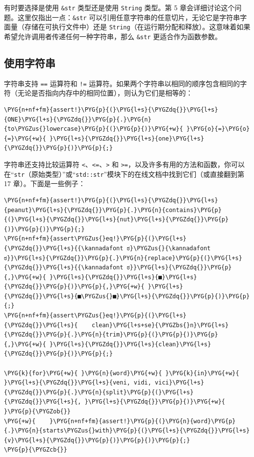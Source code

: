 有时要选择是使用 \texttt{\&str} 类型还是使用 \texttt{String} 类型。第 5 章会详细讨论这个问题。这里仅指出一点：\texttt{\&str} 可以引用任意字符串的任意切片，无论它是字符串字面量（存储在可执行文件中）还是 \texttt{String}（在运行期分配和释放）。这意味着如果希望允许调用者传递任何一种字符串，那么 \texttt{\&str} 更适合作为函数参数。

\subsection{使用字符串}

字符串支持 \texttt{==} 运算符和 \texttt{!=} 运算符。如果两个字符串以相同的顺序包含相同的字符（无论是否指向内存中的相同位置），则认为它们是相等的：

\begin{Verbatim}[commandchars=\\\{\},breaklines=true,breakanywhere=true,fontsize=\codefont,xleftmargin=17bp]
\PYG{n+nf+fm}{assert!}\PYG{p}{(}\PYG{l+s}{\PYGZdq{}}\PYG{l+s}{ONE}\PYG{l+s}{\PYGZdq{}}\PYG{p}{.}\PYG{n}{to\PYGZus{}lowercase}\PYG{p}{(}\PYG{p}{)}\PYG{+w}{ }\PYG{o}{=}\PYG{o}{=}\PYG{+w}{ }\PYG{l+s}{\PYGZdq{}}\PYG{l+s}{one}\PYG{l+s}{\PYGZdq{}}\PYG{p}{)}\PYG{p}{;}
\end{Verbatim}

字符串还支持比较运算符 \texttt{<}、\texttt{<=}、\texttt{>} 和 \texttt{>=}，以及许多有用的方法和函数，你可以在“\texttt{str}（原始类型）”或“\texttt{std::str}”模块下的在线文档中找到它们（或直接翻到第 17 章）。下面是一些例子：

\begin{Verbatim}[commandchars=\\\{\},breaklines=true,breakanywhere=true,fontsize=\codefont,xleftmargin=17bp]
\PYG{n+nf+fm}{assert!}\PYG{p}{(}\PYG{l+s}{\PYGZdq{}}\PYG{l+s}{peanut}\PYG{l+s}{\PYGZdq{}}\PYG{p}{.}\PYG{n}{contains}\PYG{p}{(}\PYG{l+s}{\PYGZdq{}}\PYG{l+s}{nut}\PYG{l+s}{\PYGZdq{}}\PYG{p}{)}\PYG{p}{)}\PYG{p}{;}
\PYG{n+nf+fm}{assert\PYGZus{}eq!}\PYG{p}{(}\PYG{l+s}{\PYGZdq{}}\PYG{l+s}{{\kannadafont ಠ}\PYGZus{}{\kannadafont ಠ}}\PYG{l+s}{\PYGZdq{}}\PYG{p}{.}\PYG{n}{replace}\PYG{p}{(}\PYG{l+s}{\PYGZdq{}}\PYG{l+s}{{\kannadafont ಠ}}\PYG{l+s}{\PYGZdq{}}\PYG{p}{,}\PYG{+w}{ }\PYG{l+s}{\PYGZdq{}}\PYG{l+s}{■}\PYG{l+s}{\PYGZdq{}}\PYG{p}{)}\PYG{p}{,}\PYG{+w}{ }\PYG{l+s}{\PYGZdq{}}\PYG{l+s}{■\PYGZus{}■}\PYG{l+s}{\PYGZdq{}}\PYG{p}{)}\PYG{p}{;}
\PYG{n+nf+fm}{assert\PYGZus{}eq!}\PYG{p}{(}\PYG{l+s}{\PYGZdq{}}\PYG{l+s}{    clean}\PYG{l+s+se}{\PYGZbs{}n}\PYG{l+s}{\PYGZdq{}}\PYG{p}{.}\PYG{n}{trim}\PYG{p}{(}\PYG{p}{)}\PYG{p}{,}\PYG{+w}{ }\PYG{l+s}{\PYGZdq{}}\PYG{l+s}{clean}\PYG{l+s}{\PYGZdq{}}\PYG{p}{)}\PYG{p}{;}

\PYG{k}{for}\PYG{+w}{ }\PYG{n}{word}\PYG{+w}{ }\PYG{k}{in}\PYG{+w}{ }\PYG{l+s}{\PYGZdq{}}\PYG{l+s}{veni, vidi, vici}\PYG{l+s}{\PYGZdq{}}\PYG{p}{.}\PYG{n}{split}\PYG{p}{(}\PYG{l+s}{\PYGZdq{}}\PYG{l+s}{, }\PYG{l+s}{\PYGZdq{}}\PYG{p}{)}\PYG{+w}{ }\PYG{p}{\PYGZob{}}
\PYG{+w}{    }\PYG{n+nf+fm}{assert!}\PYG{p}{(}\PYG{n}{word}\PYG{p}{.}\PYG{n}{starts\PYGZus{}with}\PYG{p}{(}\PYG{l+s}{\PYGZdq{}}\PYG{l+s}{v}\PYG{l+s}{\PYGZdq{}}\PYG{p}{)}\PYG{p}{)}\PYG{p}{;}
\PYG{p}{\PYGZcb{}}
\end{Verbatim}

